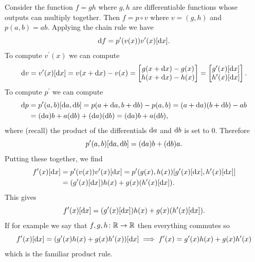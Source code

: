 \documentclass[../../book-main.tex]{subfiles}
\begin{document}
\begin{example}
    Consider the function \(f = gh\) where \(g, h\) are differentiable functions whose outputs can multiply together. Then \(f = p \circ v\) where \(v = (g, h)\) and \(p(a, b) = ab\). Applying the chain rule we have 
    \begin{equation}
        \odif{f} = p^{\prime}(v(x))v^{\prime}(x)[\odif{x}].
    \end{equation}
    To compute \(v^{\prime}(x)\) we can compute 
    \begin{equation}
        \odif{v} = v^{\prime}(x)[\odif{x}] = v(x + \odif{x}) - v(x) = \mat{g(x + \odif{x}) - g(x) \\ h(x + \odif{x}) - h(x)} = \mat{g^{\prime}(x)[\odif{x}] \\ h^{\prime}(x)[\odif{x}]}.
    \end{equation}
    To compute \(p^{\prime}\) we can compute 
    \begin{align}
        \odif{p} 
        &= p^{\prime}(a, b)[\odif{a}, \odif{b}] = p(a + \odif{a}, b + \odif{b}) - p(a, b) = (a + \odif{a})(b + \odif{b}) - ab \\
        &= (\odif{a})b + a(\odif{b}) + (\odif{a})(\odif{b}) = (\odif{a})b + a(\odif{b}),
    \end{align}
    where (recall) the product of the differentials \(\odif{a}\) and \(\odif{b}\) is set to \(0\). Therefore 
    \begin{equation}
        p^{\prime}(a, b)[\odif{a}, \odif{b}] = (\odif{a})b + (\odif{b})a.
    \end{equation}
    Putting these together, we find 
    \begin{align}
        f^{\prime}(x)[\odif{x}] 
        &= p^{\prime}(v(x))v^{\prime}(x)[\odif{x}] = p^{\prime}(g(x), h(x))[g^{\prime}(x)[\odif{x}], h^{\prime}(x)[\odif{x}]] \\
        &= (g^{\prime}(x)[\odif{x}])h(x) + g(x)(h^{\prime}(x)[\odif{x}]).
    \end{align}
    This gives 
    \begin{equation}
        f^{\prime}(x)[\odif{x}] = (g^{\prime}(x)[\odif{x}])h(x) + g(x)(h^{\prime}(x)[\odif{x}]).
    \end{equation}
    If for example we say that \(f, g, h \colon \mathbb{R} \to \mathbb{R}\) then everything commutes so
    \begin{equation}
        f^{\prime}(x)[\odif{x}] = (g^{\prime}(x)h(x) + g(x)h^{\prime}(x))[\odif{x}] \implies f^{\prime}(x) = g^{\prime}(x)h(x) + g(x)h^{\prime}(x)
    \end{equation}
    which is the familiar product rule.
\end{example}
\end{document}
